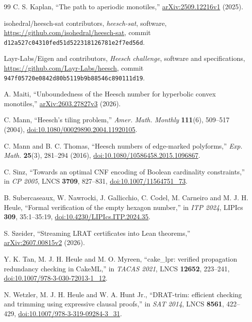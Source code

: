 \documentclass[10pt,a4paper]{article}
\theoremstyle{definition}
\theoremstyle{remark}
\begin{document}
{\begin{thebibliography}{99}
C. S. Kaplan,
``The path to aperiodic monotiles,''
\href{https://arxiv.org/abs/2509.12216v1}{arXiv:2509.12216v1} (2025).

isohedral/heesch-sat contributors,
\emph{heesch-sat}, software,
\url{https://github.com/isohedral/heesch-sat},
commit \nolinkurl{d12a527c04310fed51d522318126781e2f7ed56d}.

Layr-Labs/Eigen and contributors,
\emph{Heesch challenge}, software and specifications,
\url{https://github.com/Layr-Labs/heesch},
commit \nolinkurl{947f05720e0842d80b5119b9b88546c890111d19}.

A. Maiti,
``Unboundedness of the Heesch number for hyperbolic convex monotiles,''
\href{https://arxiv.org/abs/2603.27827v3}{arXiv:2603.27827v3} (2026).

C. Mann,
``Heesch's tiling problem,''
\emph{Amer. Math. Monthly} \textbf{111}(6), 509--517 (2004),
\href{https://doi.org/10.1080/00029890.2004.11920105}{doi:10.1080/00029890.2004.11920105}.

C. Mann and B. C. Thomas,
``Heesch numbers of edge-marked polyforms,''
\emph{Exp. Math.} \textbf{25}(3), 281--294 (2016),
\href{https://doi.org/10.1080/10586458.2015.1096867}{doi:10.1080/10586458.2015.1096867}.

C. Sinz,
``Towards an optimal CNF encoding of Boolean cardinality constraints,''
in \emph{CP 2005}, LNCS \textbf{3709}, 827--831,
\href{https://doi.org/10.1007/11564751_73}{doi:10.1007/11564751\_73}.

B. Subercaseaux, W. Nawrocki, J. Gallicchio, C. Codel, M. Carneiro and
M. J. H. Heule,
``Formal verification of the empty hexagon number,''
in \emph{ITP 2024}, LIPIcs \textbf{309}, 35:1--35:19,
\href{https://doi.org/10.4230/LIPIcs.ITP.2024.35}{doi:10.4230/LIPIcs.ITP.2024.35}.

S. Szeider,
``Streaming LRAT certificates into Lean theorems,''
\href{https://arxiv.org/abs/2607.00815v2}{arXiv:2607.00815v2} (2026).

Y. K. Tan, M. J. H. Heule and M. O. Myreen,
``cake\_lpr: verified propagation redundancy checking in CakeML,''
in \emph{TACAS 2021}, LNCS \textbf{12652}, 223--241,
\href{https://doi.org/10.1007/978-3-030-72013-1_12}{doi:10.1007/978-3-030-72013-1\_12}.

N. Wetzler, M. J. H. Heule and W. A. Hunt Jr.,
``DRAT-trim: efficient checking and trimming using expressive clausal
proofs,''
in \emph{SAT 2014}, LNCS \textbf{8561}, 422--429,
\href{https://doi.org/10.1007/978-3-319-09284-3_31}{doi:10.1007/978-3-319-09284-3\_31}.


\end{thebibliography}}
\end{document}
